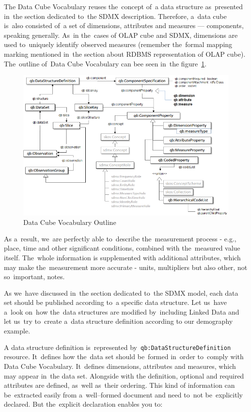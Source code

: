 The Data Cube Vocabulary reuses the~concept of~a data structure as~presented in~the section
dedicated to~the SDMX description. Therefore, a~data cube is~also consisted of~a set of
dimensions, attributes and measures --- components, speaking generally. As~in the~cases of
OLAP cube and SDMX, dimensions are used to~uniquely identify observed measures
(remember the~formal mapping marking mentioned in~the section about RDBMS representation
of OLAP cube). The~outline of~Data Cube Vocabulary can bee seen in~the 
figure~\ref{fig:lod-cloud}.
 
\begin{figure}
	\centering
	\includegraphics[width=150mm]{img/dcv-schema.png}
	\caption{Data Cube Vocabulary Outline~\cite{dcv}}
	\label{fig:lod-cloud}
\end{figure}

As a~result, we~are perfectly able to~describe the~measurement process - e.g., place, time and
other significant conditions, combined with the~measured value itself. The~whole information
is supplemented with additional attributes, which may make the~measurement more accurate
- units, multipliers but also other, not so~important, notes.

As we~have discussed in~the section dedicated to~the SDMX model, each data set should be
published according to~a specific data structure. Let us~have a~look on~how the~data structures are
modified by~including Linked Data and let us~try to~create a~data structure definition according
to our demography example.

A data structure definition is~represented by~\texttt{qb:DataStructureDefinition} resource. It~defines
how the~data set should be~formed in~order to~comply with Data Cube Vocabulary. It~defines
dimensions, attributes and measures, which may appear in~the data set. Alongside with the
definition, optional and required attributes are defined, as~well as~their ordering. This kind
of information can be~extracted easily from a~well--formed document and need to~not be~explicitly
declared. But the~explicit declaration enables you to:

